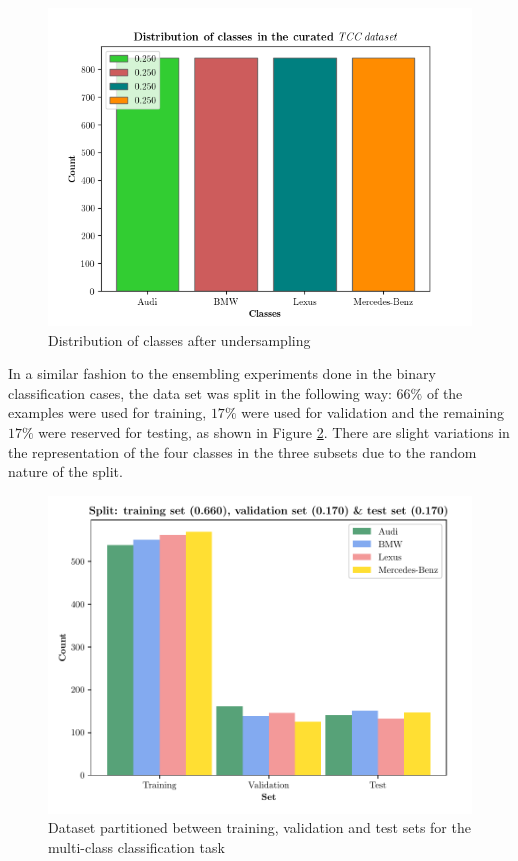 \documentclass[conference]{IEEEtran}
\begin{document}
\begin{figure}[ht]
    \centering
    \includegraphics[scale=0.48]{main_19_multiclass_classification_00_undersampl_balanced_dataset.png}
    \caption{Distribution of classes after undersampling}
    \label{fig:dist}
\end{figure}

In a similar fashion to the ensembling experiments done in the binary classification cases, the data set was split in the following way: $66\%$ of the examples were used for training, $17\%$ were used for validation and the remaining $17\%$ were reserved for testing, as shown in Figure \ref{fig:multi}. There are slight variations in the representation of the four classes in the three subsets due to the random nature of the split. 

\begin{figure}[ht]
    \centering
    \includegraphics[scale=0.5]{main_23_multiclass_00split.pdf}
    \caption{Dataset partitioned between training, validation and test sets for the multi-class classification task}
    \label{fig:multi}
\end{figure}
\end{document}
